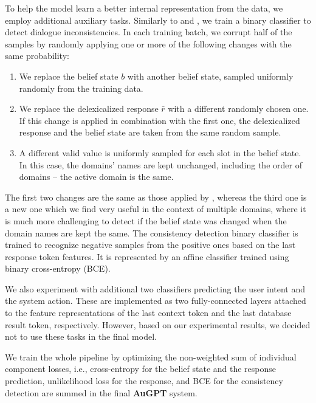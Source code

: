 \documentclass[letterpaper]{article} %
\begin{document}
To help the model learn a better internal representation from the data, we employ additional auxiliary tasks. Similarly to \citet{devlin2019} and \citet{peng2020}, we train a binary classifier to detect dialogue inconsistencies. In each training batch, we corrupt half of the samples by randomly applying one or more of the following changes with the same probability:
\begin{enumerate}
    \item We replace the belief state $b$ with another belief state, sampled uniformly randomly from the training data.
    \item We replace the delexicalized response $\bar{r}$ with a different randomly chosen one. If this change is applied in combination with the first one, the delexicalized response and the belief state are taken from the same random sample.
    \item A different valid value is uniformly sampled for each slot in the belief state. In this case, the domains' names are kept unchanged, including the order of domains -- the active domain is the same.
\end{enumerate}
The first two changes are the same as those applied by \citet{peng2020}, whereas the third one is a new one which we find very useful in the context of multiple domains, where it is much more challenging to detect if the belief state was changed when the domain names are kept the same.
The consistency detection binary classifier is trained to recognize negative samples from the positive ones based on the last response token features. It is represented by an affine classifier trained using binary cross-entropy (BCE).

We also experiment with additional two classifiers predicting the user intent and the system action. These are implemented as two fully-connected layers attached to the feature representations of the last context token and the last database result token, respectively. 
However, based on our experimental results, we decided not to use these tasks in the final model.

We train the whole pipeline by optimizing the non-weighted sum of individual component losses, i.e., cross-entropy for the belief state and the response prediction, unlikelihood loss for the response, and BCE for the consistency detection are summed in the final \textbf{AuGPT} system.
\end{document}
